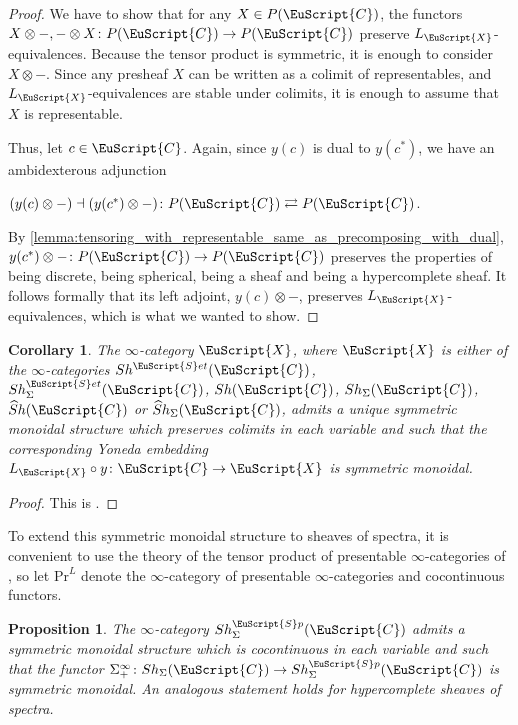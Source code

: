 \documentclass[oneside,a4paper]{amsart}
\newcommand{\euscr}[1]{\EuScript{#1}} %
\newcommand{\ccat}{\euscr{C}} %
\newcommand{\spectra}{\euscr{S}p} %
\newcommand{\sets}{\euscr{S}et} %
\newcommand{\hpsheaves}{\widehat{S}h} %
\theoremstyle{plain}
\newtheorem{prop}[thm]{Proposition}
\newtheorem{cor}[thm]{Corollary}
\theoremstyle{definition}
\theoremstyle{remark}
\begin{document}
\begin{proof}
 We have to show that for any $X \in P(\ccat)$, the functors $X \otimes -, - \otimes X \colon P(\ccat) \rightarrow P(\ccat)$ preserve $L_{\euscr{X}}$-equivalences. Because the tensor product is symmetric, it is enough to consider $X \otimes -$. Since any presheaf $X$ can be written as a colimit of representables, and $L_{\euscr{X}}$-equivalences are stable under colimits, it is enough to assume that $X$ is representable. 

Thus, let $c \in \ccat$. Again, since $y(c)$ is dual to $y(c^{*})$, we have an ambidexterous adjunction 

\begin{center}
$(y(c) \otimes -) \dashv (y(c^{*}) \otimes -) \colon P(\ccat) \rightleftarrows P(\ccat)$.
\end{center}
By \cref{lemma:tensoring_with_representable_same_as_precomposing_with_dual}, $y(c^{*}) \otimes - \colon P(\ccat) \rightarrow P(\ccat)$ preserves the properties of being discrete, being spherical, being a sheaf and being a hypercomplete sheaf. It follows formally that its left adjoint, $y(c) \otimes -$, preserves $L_{\euscr{X}}$-equivalences, which is what we wanted to show. 
\end{proof}

\begin{cor}
\label{cor:symmetric_monoidal_structure_on_different_sheaf_variants}
The $\infty$-category $\euscr{X}$, where $\euscr{X}$ is either of the $\infty$-categories $Sh^{\sets}(\ccat)$, $Sh^{\sets}_{\Sigma}(\ccat)$, $Sh(\ccat)$, $Sh_{\Sigma}(\ccat)$, $\hpsheaves(\ccat)$ or $\hpsheaves_{\Sigma}(\ccat)$, admits a unique symmetric monoidal structure which preserves colimits in each variable and such that the corresponding Yoneda embedding $L_{\euscr{X}} \circ y \colon \ccat \rightarrow \euscr{X}$ is symmetric monoidal. 
\end{cor}

\begin{proof}
This is \cite[2.2.1.9]{higher_algebra}.
\end{proof}

To extend this symmetric monoidal structure to sheaves of spectra, it is convenient to use the theory of the tensor product of presentable $\infty$-categories of \cite[4.8]{higher_algebra}, so let $\mathrm{Pr}^{L}$ denote the $\infty$-category of presentable $\infty$-categories and cocontinuous functors. 


\begin{prop}
\label{prop:symmetric_monoidal_structure_on_spherical_sheaves_of_spectra}
The $\infty$-category $Sh^{\spectra}_{\Sigma}(\ccat)$ admits a symmetric monoidal structure which is cocontinuous in each variable and such that the functor $\Sigma_{+}^{\infty} \colon Sh_{\Sigma}(\ccat) \rightarrow Sh^{\spectra}_{\Sigma}(\ccat)$ is symmetric monoidal. An analogous statement holds for hypercomplete sheaves of spectra. 
\end{prop}
\end{document}
